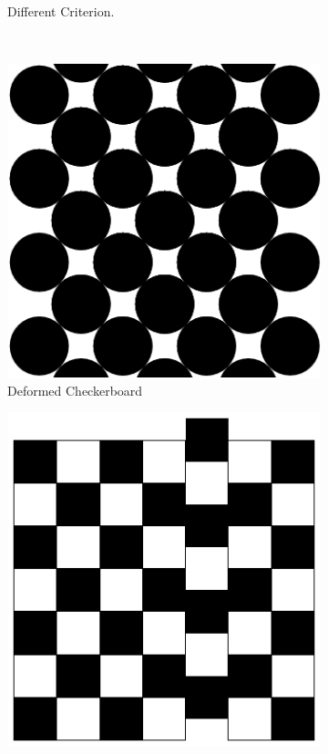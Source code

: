 \documentclass[]{article}
\begin{document}
\begin{figure}[H]
\begin{subfigure}[t]{0.4\textwidth}
    \caption{Different Criterion.}
    \label{fig:critchecker}
\end{subfigure}
  \hspace*{\fill}\\
  \hspace*{\fill}
  \begin{subfigure}[t]{0.4\textwidth}
  	\includegraphics[width=\textwidth]{CheckerboardCircles}
      \caption{Deformed Checkerboard}
      \label{fig:deformedchecker}
  \end{subfigure}
      \hspace*{\fill} 
\begin{subfigure}[t]{0.4\textwidth}
	\includegraphics[width=\textwidth]{CheckerboardAperiodic}

\end{subfigure}
\end{figure}
\end{document}

